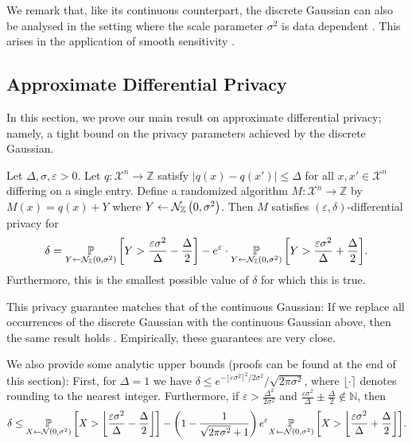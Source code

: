 \documentclass{jpcfinal} %
\newcommand{\dgausss}[2]{{\discN\left(#1,#2\right)}}
\newcommand{\dgauss}[1]{\dgausss{0}{#1}}
\newcommand{\pr}[2]{{\ifx&#1& \mathbb{P} \else
\underset{#1}{\mathbb{P}} \fi \left[#2\right]}}
\newcommand{\eps}{\varepsilon}
\newcommand{\Z}{\mathbb{Z}}
\begin{document}
We remark that, like its continuous counterpart, the discrete Gaussian can also be analysed in the setting where the scale parameter $\sigma^2$ is data dependent \citep{BunDRS18}. This arises in the application of smooth sensitivity \citep{NissimRS07,BunS19}.

\subsection{Approximate Differential Privacy}
In this section, we prove our main result on approximate differential privacy; namely, a tight bound on the privacy parameters achieved by the discrete Gaussian.
\begin{thm}\label{thm:approx-dp}
Let $\Delta,\sigma,\eps>0$. Let $q\colon \mathcal{X}^n \to \Z$ satisfy $|q(x)-q(x')|\le\Delta$ for all $x,x'\in\mathcal{X}^n$ differing on a single entry. Define a randomized algorithm $M\colon \mathcal{X}^n \to \Z$ by $M(x)=q(x)+Y$ where $Y \gets \dgauss{\sigma^2}$. Then $M$ satisfies $(\eps,\delta)$-differential privacy for 
\begin{equation}
\delta = \pr{Y \gets \dgauss{\sigma^2}}{Y > \frac{\eps \sigma^2}{\Delta} - \frac{\Delta}{2}} - e^\eps \cdot \pr{Y \gets \dgauss{\sigma^2}}{Y > \frac{\eps \sigma^2}{\Delta} + \frac{\Delta}{2}}.
\end{equation}
Furthermore, this is the smallest possible value of $\delta$ for which this is true.
\end{thm}
\noindent This privacy guarantee matches that of the continuous Gaussian: If we replace all occurrences of the discrete Gaussian with the continuous Gaussian above, then the same result holds \cite[Thm.~8]{BalleW18}. Empirically, these guarantees are very close.


We also provide some analytic upper bounds (proofs can be found at the end of this section): First, for $\Delta=1$ we have $\delta \le e^{-\lfloor \eps \sigma^2 \rceil^2/2\sigma^2}/\sqrt{2\pi\sigma^2}$, where $\lfloor \cdot \rceil$ denotes rounding to the nearest integer. Furthermore, if $\eps > \frac{\Delta^2}{2\sigma^2}$ and $\frac{\eps\sigma^2}{\Delta}\pm \frac{\Delta}{2}\notin \mathbb{N}$, then \begin{equation}
\delta \le \pr{X \gets \mathcal{N}(0,\sigma^2)}{ X > \left\lfloor \frac{\eps\sigma^2}{\Delta}-\frac{\Delta}{2} \right\rfloor }-\left(1-\frac{1}{\sqrt{2\pi\sigma^2}+1}\right)e^\eps\pr{X \gets \mathcal{N}(0,\sigma^2)}{X > \left\lfloor \frac{\eps\sigma^2}{\Delta}+\frac{\Delta}{2} \right\rfloor }.\label{eq:analytic_ed}
\end{equation}
\end{document}
